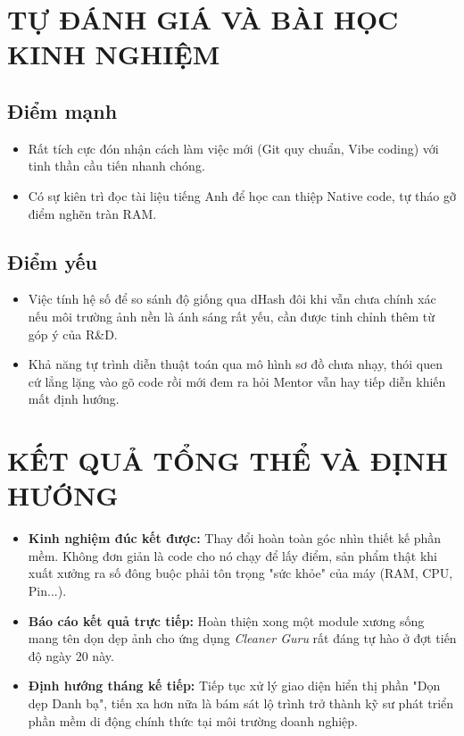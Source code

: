\documentclass[12pt, a4paper]{article}
\begin{document}
\section{TỰ ĐÁNH GIÁ VÀ BÀI HỌC KINH NGHIỆM}
\subsection{Điểm mạnh}
\begin{itemize}
    \item Rất tích cực đón nhận cách làm việc mới (Git quy chuẩn, Vibe coding) với tinh thần cầu tiến nhanh chóng.
    \item Có sự kiên trì đọc tài liệu tiếng Anh để học can thiệp Native code, tự tháo gỡ điểm nghẽn tràn RAM.
\end{itemize}
\subsection{Điểm yếu}
\begin{itemize}
    \item Việc tính hệ số để so sánh độ giống qua dHash đôi khi vẫn chưa chính xác nếu môi trường ảnh nền là ánh sáng rất yếu, cần được tinh chỉnh thêm từ góp ý của R\&D.
    \item Khả năng tự trình diễn thuật toán qua mô hình sơ đồ chưa nhạy, thói quen cứ lẳng lặng vào gõ code rồi mới đem ra hỏi Mentor vẫn hay tiếp diễn khiến mất định hướng.
\end{itemize}

\section{KẾT QUẢ TỔNG THỂ VÀ ĐỊNH HƯỚNG}
\begin{itemize}
    \item \textbf{Kinh nghiệm đúc kết được:} Thay đổi hoàn toàn góc nhìn thiết kế phần mềm. Không đơn giản là code cho nó chạy để lấy điểm, sản phẩm thật khi xuất xưởng ra số đông buộc phải tôn trọng "sức khỏe" của máy (RAM, CPU, Pin...).
    \item \textbf{Báo cáo kết quả trực tiếp:} Hoàn thiện xong một module xương sống mang tên dọn dẹp ảnh cho ứng dụng \textit{Cleaner Guru} rất đáng tự hào ở đợt tiến độ ngày 20 này.
    \item \textbf{Định hướng tháng kế tiếp:} Tiếp tục xử lý giao diện hiển thị phần "Dọn dẹp Danh bạ", tiến xa hơn nữa là bám sát lộ trình trở thành kỹ sư phát triển phần mềm di động chính thức tại môi trường doanh nghiệp.
\end{itemize}
\end{document}
